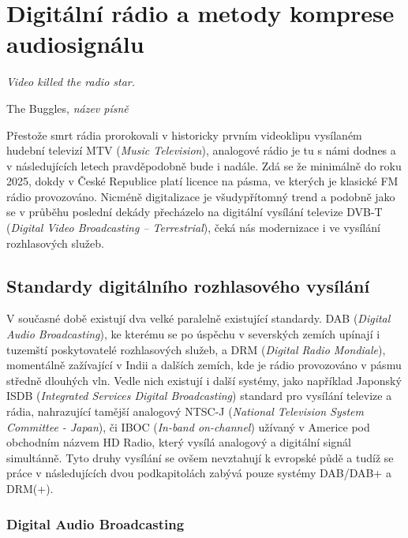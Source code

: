 \chapter{Digitální rádio a metody komprese audiosignálu}
\label{chap.digitalRadio}

\epigraph{\textit{\hfill Video killed the radio star.}}{The Buggles, \textit{název písně}}

Přestože smrt rádia prorokovali  v historicky prvním videoklipu vysílaném hudební televizí MTV (\textit{Music Television}), analogové rádio je tu s námi dodnes a v následujících letech pravděpodobně bude i nadále. Zdá se že minimálně do roku 2025, dokdy v České Republice platí licence na pásma, ve kterých je klasické FM rádio provozováno. Nicméně digitalizace je všudypřítomný trend a podobně jako se v průběhu poslední dekády přecházelo na digitální vysílání televize DVB-T (\textit{Digital Video Broadcasting – Terrestrial}), čeká nás modernizace i ve vysílání rozhlasových služeb. 

\section{Standardy digitálního rozhlasového vysílání}

V současné době existují dva velké paralelně existující standardy. DAB (\textit{Digital Audio Broadcasting}), ke kterému se po úspěchu v severských zemích upínají i tuzemští poskytovatelé rozhlasových služeb, a DRM (\textit{Digital Radio Mondiale}), momentálně zažívající  v Indii a dalších zemích, kde je rádio provozováno v pásmu středně dlouhých vln. Vedle nich existují i další systémy, jako například Japonský ISDB (\textit{Integrated Services Digital Broadcasting}) standard pro vysílání televize a rádia, nahrazující tamější analogový NTSC-J (\textit{National Television System Committee - Japan}), či IBOC (\textit{In-band on-channel}) užívaný v Americe pod obchodním názvem HD Radio, který vysílá analogový a digitální signál simultánně. Tyto druhy vysílání se ovšem nevztahují k evropské půdě a tudíž se práce v následujících dvou podkapitolách zabývá pouze systémy DAB/DAB+ a DRM(+).

\subsection{Digital Audio Broadcasting}

